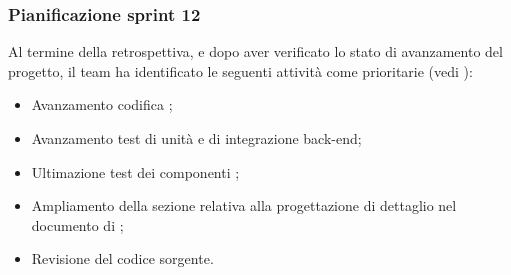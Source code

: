 \subsubsection{Pianificazione sprint 12}
\par Al termine della retrospettiva, e dopo aver verificato lo stato di avanzamento del progetto, il team ha identificato le seguenti attività come prioritarie (vedi ):
\begin{itemize}
	\item Avanzamento codifica ;
	\item Avanzamento test di unità e di integrazione back-end;
	\item Ultimazione test dei componenti ;
	\item Ampliamento della sezione relativa alla progettazione di dettaglio nel documento di \ST;
	\item Revisione del codice sorgente.
\end{itemize}